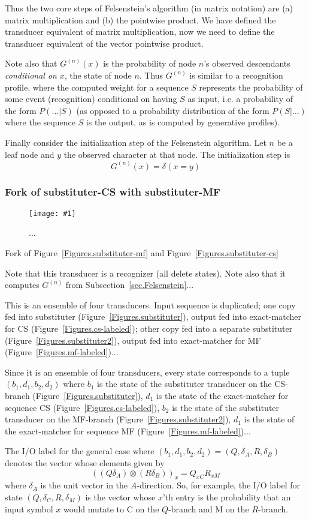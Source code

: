 \documentclass{article}
\newcommand{\secref}[1]{Subsection~\ref{sec.#1}}
\newcommand{\seclabel}[1]{\label{sec.#1}}
\newcommand{\figref}[1]{Figure~\ref{Figures.#1}}
\newcommand{\figlabel}[1]{\label{Figures.#1}}
\newcommand{\easyfig}[4]{
\begin{figure}
\texttt{[image: \#1]}
\caption{ \figlabel{#3} #4}
\end{figure}}
\newcommand{\pdffig}[2]{\easyfig{#1-fig.pdf}{}{#1}{#2}}
\newcommand\fork{\otimes}
\begin{document}
Thus the two core steps of Felsenstein's algorithm (in matrix notation)
are (a) matrix multiplication and (b) the pointwise product.
We have defined the transducer equivalent of matrix multiplication,
now we need to define the transducer equivalent of the vector pointwise product.

Note also that $G^{(n)}(x)$ is the probability of node $n$'s observed descendants
{\em conditional on} $x$, the state of node $n$.
Thus $G^{(n)}$ is similar to a recognition profile,
where the computed weight for a sequence $S$ represents
the probability of some event (recognition) conditional on having $S$ as input,
i.e. a probability of the form $P(\ldots|S)$
(as opposed to a probability distribution of the form $P(S|\ldots)$ where the sequence $S$ is the output,
as is computed by generative profiles).

Finally consider the initialization step of the Felsenstein algorithm.
Let $n$ be a leaf node and $y$ the observed character at that node.
The initialization step is
\[
G^{(n)}(x) = \delta(x=y)
\]

\subsubsection{Fork of substituter-CS with substituter-MF}
\seclabel{fork-subcs-submf}

\pdffig{fork-subcs-submf}{...}

Fork of \figref{substituter-mf} and \figref{substituter-cs}

Note that this transducer is a recognizer (all delete states).
Note also that it computes $G^{(n)}$ from \secref{Felsenstein}...

This is an ensemble of four transducers.
Input sequence is duplicated;
one copy fed into substituter (\figref{substituter}),
output fed into exact-matcher for CS (\figref{cs-labeled});
other copy fed into a separate substituter (\figref{substituter2}),
output fed into exact-matcher for MF (\figref{mf-labeled})...

Since it is an ensemble of four transducers, every state corresponds to a tuple $(b_1,d_1,b_2,d_2)$
where
$b_1$ is the state of the substituter transducer on the CS-branch (\figref{substituter}),
$d_1$ is the state of the exact-matcher for sequence CS (\figref{cs-labeled}),
$b_2$ is the state of the substituter transducer on the MF-branch (\figref{substituter2}),
$d_1$ is the state of the exact-matcher for sequence MF (\figref{mf-labeled})...

The I/O label for the general case where $(b_1,d_1,b_2,d_2) = (Q,\delta_A,R,\delta_B)$
denotes the vector whose elements given by
\[
\left( (Q \delta_A) \fork (R \delta_B) \right)_x
= Q_{xC} R_{xM}
\]
where $\delta_A$ is the unit vector in the $A$-direction.
So, for example,
the I/O label for state $(Q,\delta_C,R,\delta_M)$
is the vector whose $x$'th entry is the probability that an input symbol $x$
would mutate to C on the $Q$-branch and M on the $R$-branch.
\end{document}
